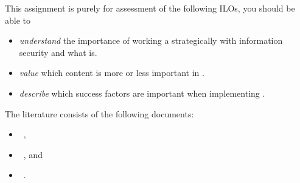This assignment is purely for assessment of the following \acp{ILO}, you should 
be able to
\begin{itemize}
  \item \emph{understand} the importance of working a strategically with 
    information security and what  is.
  \item \emph{value} which content is more or less important in .
  \item \emph{describe} which success factors are important when implementing 
    .
\end{itemize}

The literature consists of the following documents:
\begin{itemize}
  \item {}~\cite{MSB2011itm},
  \item {}~\cite{MSB2011sle}, and
  \item {}~\cite{MSB2011p}.
\end{itemize}
